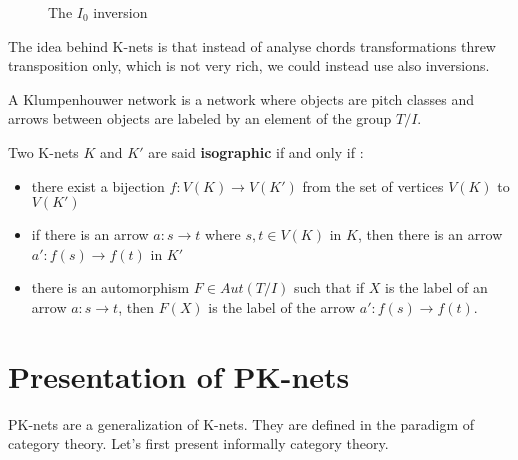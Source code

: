 \documentclass{report}
\begin{document}
\begin{figure}[ht]
    \centering
    \caption{The $I_0$ inversion}
    \label{inversions}
\end{figure}

The idea behind K-nets is that instead of analyse chords transformations threw transposition only, which is not very rich, we could instead use also inversions.

\begin{defn}
 A Klumpenhouwer network is a network where objects are pitch classes and arrows between objects are labeled by an element of the group $T/I$.
\end{defn}

\begin{defn}
Two K-nets $K$ and $K'$ are said \textbf{isographic} if and only if :
\begin{itemize}
    \item there exist a bijection $f:V(K)\rightarrow V(K')$ from the set of vertices $V(K)$ to $V(K')$
    \item if there is an arrow $a:s\rightarrow t$ where $s,t\in V(K)$ in $K$, then there is an arrow $a':f(s)\rightarrow f(t)$ in $K'$
    \item there is an automorphism $F \in Aut(T/I)$ such that if $X$ is the label of an arrow $a:s\rightarrow t$, then $F(X)$ is the label of the arrow $a':f(s)\rightarrow f(t)$.
\end{itemize}
\end{defn}




\section{Presentation of PK-nets}

PK-nets\cite{PAAE2016} are a generalization of K-nets. They are defined in the paradigm of category theory. Let's first present informally category theory.
\end{document}
